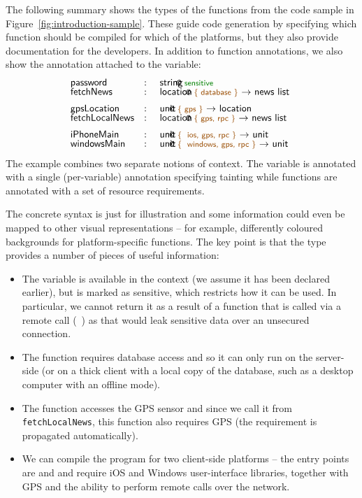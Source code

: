 The following summary shows the types of the functions from the code sample in
Figure~\ref{fig:introduction-sample}. These guide code generation by specifying which
function should be compiled for which of the platforms, but they also provide documentation
for the developers. In addition to function annotations, we also show the annotation attached
to the  variable:
%
\begin{equation*}
\begin{array}{lcl}
 \ident{password} &:& $\introvar{string}{sensitive}$\\[-0.25em]
 \ident{fetchNews} &:& $\introfunc{location}{database}{news~list}$\\[0.5em]
 \ident{gpsLocation} &:& $\introfunc{unit}{gps}{location}$\\[-0.25em]
 \ident{fetchLocalNews} &:& $\introfunc{location}{gps, rpc}{news~list}$\\[0.5em]
 \ident{iPhoneMain} &:& $\introfunc{unit}{ ios, gps, rpc}{unit}$\\[-0.25em]
 \ident{windowsMain} &:& $\introfunc{unit}{ windows, gps, rpc}{unit}$
\end{array}
\end{equation*}
%
The example combines two separate notions of context. The variable  is annotated
with a single (per-variable) annotation specifying tainting while
functions are annotated with a set of resource requirements.

The concrete syntax is just for illustration and
some information could even be mapped to other visual representations -- for example, differently
coloured backgrounds for platform-specific functions. The key point is that the type provides a
number of pieces of useful information:

\begin{itemize}
\item The  variable is available in the context (we assume it has been declared
  earlier), but is marked as sensitive, which restricts how it can be used. In particular, we
  cannot return it as a result of a function that is called via a remote call (\eg~)
  as that would leak sensitive data over an unsecured connection.

\item The  function requires database access and so it can only run on the server-side
  (or on a thick client with a local copy of the database, such as a desktop computer with an offline mode).

\item The  function accesses the GPS sensor and since we call it 
  from \texttt{fetchLocalNews}, this function also requires GPS (the requirement is propagated
  automatically).

\item We can compile the program for two client-side platforms -- the entry points are 
  and  and require iOS and Windows user-interface libraries, together with
  GPS and the ability to perform remote calls over the network.
\end{itemize}


